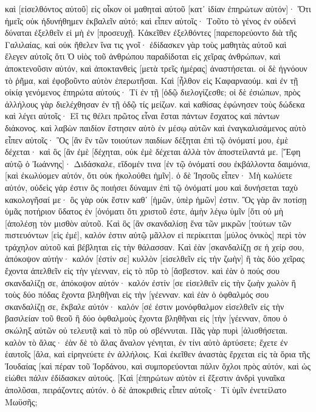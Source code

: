 καὶ [εἰσελθόντος αὐτοῦ] εἰς οἶκον οἱ μαθηταὶ αὐτοῦ [κατ᾽ ἰδίαν ἐπηρώτων αὐτόν]· Ὅτι ἡμεῖς οὐκ ἠδυνήθημεν ἐκβαλεῖν αὐτό; 
καὶ εἶπεν αὐτοῖς· Τοῦτο τὸ γένος ἐν οὐδενὶ δύναται ἐξελθεῖν εἰ μὴ ἐν [προσευχῇ. 
Κἀκεῖθεν ἐξελθόντες [παρεπορεύοντο διὰ τῆς Γαλιλαίας, καὶ οὐκ ἤθελεν ἵνα τις γνοῖ· 
ἐδίδασκεν γὰρ τοὺς μαθητὰς αὐτοῦ καὶ ἔλεγεν αὐτοῖς ὅτι Ὁ υἱὸς τοῦ ἀνθρώπου παραδίδοται εἰς χεῖρας ἀνθρώπων, καὶ ἀποκτενοῦσιν αὐτόν, καὶ ἀποκτανθεὶς [μετὰ τρεῖς ἡμέρας] ἀναστήσεται. 
οἱ δὲ ἠγνόουν τὸ ῥῆμα, καὶ ἐφοβοῦντο αὐτὸν ἐπερωτῆσαι. 
Καὶ [ἦλθον εἰς Καφαρναούμ. καὶ ἐν τῇ οἰκίᾳ γενόμενος ἐπηρώτα αὐτούς· Τί ἐν τῇ [ὁδῷ διελογίζεσθε; 
οἱ δὲ ἐσιώπων, πρὸς ἀλλήλους γὰρ διελέχθησαν ἐν τῇ ὁδῷ τίς μείζων. 
καὶ καθίσας ἐφώνησεν τοὺς δώδεκα καὶ λέγει αὐτοῖς· Εἴ τις θέλει πρῶτος εἶναι ἔσται πάντων ἔσχατος καὶ πάντων διάκονος. 
καὶ λαβὼν παιδίον ἔστησεν αὐτὸ ἐν μέσῳ αὐτῶν καὶ ἐναγκαλισάμενος αὐτὸ εἶπεν αὐτοῖς· 
Ὃς [ἂν ἓν τῶν τοιούτων παιδίων δέξηται ἐπὶ τῷ ὀνόματί μου, ἐμὲ δέχεται· καὶ ὃς [ἂν ἐμὲ [δέχηται, οὐκ ἐμὲ δέχεται ἀλλὰ τὸν ἀποστείλαντά με. 
[Ἔφη αὐτῷ ὁ Ἰωάννης]· Διδάσκαλε, εἴδομέν τινα [ἐν τῷ ὀνόματί σου ἐκβάλλοντα δαιμόνια, [καὶ ἐκωλύομεν αὐτόν, ὅτι οὐκ ἠκολούθει ἡμῖν]. 
ὁ δὲ Ἰησοῦς εἶπεν· Μὴ κωλύετε αὐτόν, οὐδεὶς γάρ ἐστιν ὃς ποιήσει δύναμιν ἐπὶ τῷ ὀνόματί μου καὶ δυνήσεται ταχὺ κακολογῆσαί με· 
ὃς γὰρ οὐκ ἔστιν καθ᾽ [ἡμῶν, ὑπὲρ ἡμῶν] ἐστιν. 
Ὃς γὰρ ἂν ποτίσῃ ὑμᾶς ποτήριον ὕδατος ἐν [ὀνόματι ὅτι χριστοῦ ἐστε, ἀμὴν λέγω ὑμῖν [ὅτι οὐ μὴ [ἀπολέσῃ τὸν μισθὸν αὐτοῦ. 
Καὶ ὃς [ἂν σκανδαλίσῃ ἕνα τῶν μικρῶν [τούτων τῶν πιστευόντων [εἰς ἐμέ], καλόν ἐστιν αὐτῷ μᾶλλον εἰ περίκειται [μύλος ὀνικὸς] περὶ τὸν τράχηλον αὐτοῦ καὶ βέβληται εἰς τὴν θάλασσαν. 
Καὶ ἐὰν [σκανδαλίζῃ σε ἡ χείρ σου, ἀπόκοψον αὐτήν· καλόν [ἐστίν σε] κυλλὸν [εἰσελθεῖν εἰς τὴν ζωὴν] ἢ τὰς δύο χεῖρας ἔχοντα ἀπελθεῖν εἰς τὴν γέενναν, εἰς τὸ πῦρ τὸ [ἄσβεστον. 
καὶ ἐὰν ὁ πούς σου σκανδαλίζῃ σε, ἀπόκοψον αὐτόν· καλόν ἐστίν [σε εἰσελθεῖν εἰς τὴν ζωὴν χωλὸν ἢ τοὺς δύο πόδας ἔχοντα βληθῆναι εἰς τὴν [γέενναν. 
καὶ ἐὰν ὁ ὀφθαλμός σου σκανδαλίζῃ σε, ἔκβαλε αὐτόν· καλόν [σέ ἐστιν μονόφθαλμον εἰσελθεῖν εἰς τὴν βασιλείαν τοῦ θεοῦ ἢ δύο ὀφθαλμοὺς ἔχοντα βληθῆναι εἰς [τὴν [γέενναν, 
ὅπου ὁ σκώληξ αὐτῶν οὐ τελευτᾷ καὶ τὸ πῦρ οὐ σβέννυται. 
Πᾶς γὰρ πυρὶ [ἁλισθήσεται. 
καλὸν τὸ ἅλας· ἐὰν δὲ τὸ ἅλας ἄναλον γένηται, ἐν τίνι αὐτὸ ἀρτύσετε; ἔχετε ἐν ἑαυτοῖς [ἅλα, καὶ εἰρηνεύετε ἐν ἀλλήλοις. 
Καὶ ἐκεῖθεν ἀναστὰς ἔρχεται εἰς τὰ ὅρια τῆς Ἰουδαίας [καὶ πέραν τοῦ Ἰορδάνου, καὶ συμπορεύονται πάλιν ὄχλοι πρὸς αὐτόν, καὶ ὡς εἰώθει πάλιν ἐδίδασκεν αὐτούς. 
[Καὶ [ἐπηρώτων αὐτὸν εἰ ἔξεστιν ἀνδρὶ γυναῖκα ἀπολῦσαι, πειράζοντες αὐτόν. 
ὁ δὲ ἀποκριθεὶς εἶπεν αὐτοῖς· Τί ὑμῖν ἐνετείλατο Μωϋσῆς; 
